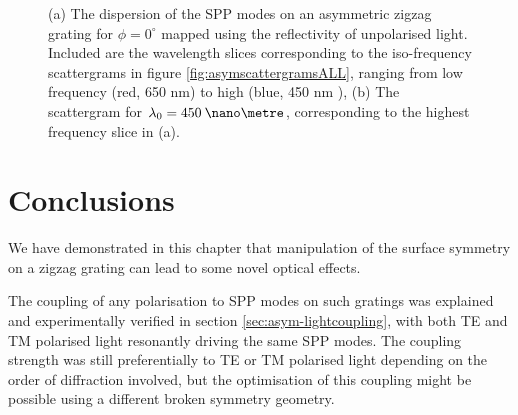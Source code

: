 \begin{figure}
\begin{center}
\end{center}
\caption[The dispersion of the SPP modes on an asymmetric zigzag grating for $\phi=0^\circ$, and the scattergram for $\lambda_0=450\:\nano\metre$.]{(a) The dispersion of the SPP modes on an asymmetric zigzag grating for $\phi=0^\circ$ mapped using the reflectivity of unpolarised light. Included are the wavelength slices corresponding to the iso-frequency scattergrams in figure \ref{fig:asymscattergramsALL}, ranging from low frequency (red, 650 nm) to high (blue, 450 nm ), (b) The scattergram for $\lambda_0=450\:\nano\metre$, corresponding to the highest frequency slice in (a).\label{fig:450scatterAsym}}
\end{figure}



\section{Conclusions}
We have demonstrated in this chapter that manipulation of the surface symmetry on a zigzag grating can lead to some novel optical effects. 

The coupling of any polarisation to SPP modes on such gratings was explained and experimentally verified in section \ref{sec:asym-lightcoupling}, with both TE and TM polarised light resonantly driving the same SPP modes. The coupling strength was still preferentially to TE or TM polarised light depending on the order of diffraction involved, but the optimisation of this coupling might be possible using a different broken symmetry geometry.

